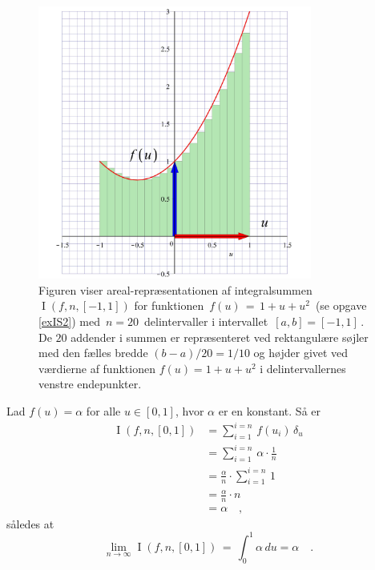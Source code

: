 \begin{figure}[h]
\centerline{\includegraphics[height=90mm]{FIGS/plotIntArea}}
\begin{center}
\caption{\small{Figuren viser areal-repræsentationen
af integralsummen $\operatorname{I}(f,n, [-1,1])$ for funktionen $\,f(u) \, = \, 1 + u
+ u^{2}\,$  (se opgave
\ref{exIS2}) med $\,n = 20\,$ delintervaller i
intervallet $\,[a, b] = [-1, 1]\,$. De $20$
addender i summen er repræsenteret ved
rektangulære søjler med den fælles bredde
$(b-a)/20 = 1/10$ og højder givet ved værdierne
af funktionen $f(u) = 1 + u + u^2$ i
delin\-ter\-vallernes venstre endepunkter. }}
\label{FigIS}
\end{center}
\end{figure}





\begin{example}\label{exampConst}
Lad $f(u) = \alpha$ for alle $u\in [0,1]$, hvor $\alpha$ er en konstant. Så er
\begin{equation}
\begin{aligned}
\operatorname{I}(f,n, [0, 1]) &= \sum_{i=1}^{i=n}\, f\left(u_{i}\right)\,\delta_{u} \\
&= \sum_{i=1}^{i=n}\, \alpha \cdot \frac{1}{n} \\
&= \frac{\alpha}{n} \cdot \sum_{i=1}^{i=n}\, 1 \\
&= \frac{\alpha}{n} \cdot n \\
&= \alpha \quad ,
\end{aligned}
\end{equation}
således at
\begin{equation}
\lim_{n \to \infty} \operatorname{I}(f,n, [0, 1]) \, = \, \int_{0}^{1} \alpha \, du = \alpha \quad .
\end{equation}
\end{example}

